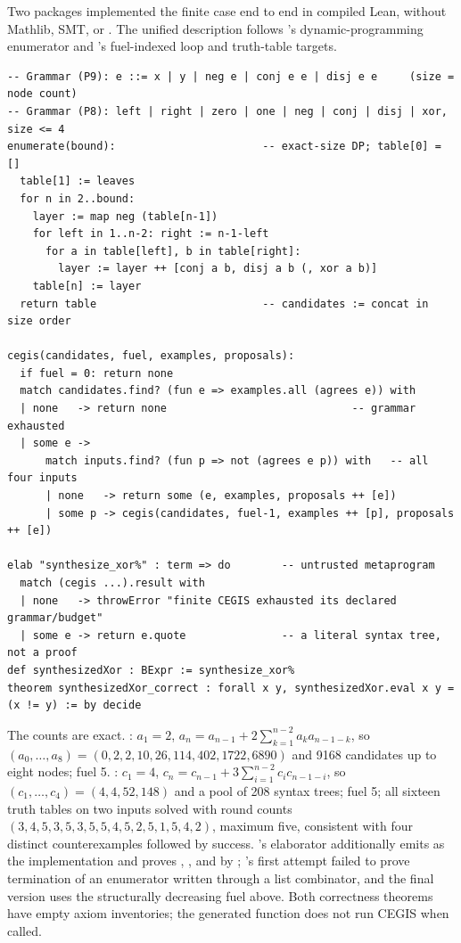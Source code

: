 Two packages implemented the finite case end to end in compiled Lean, without Mathlib, SMT, or . The unified description follows 's dynamic-programming enumerator and 's fuel-indexed loop and truth-table targets.

\begin{lstlisting}
-- Grammar (P9): e ::= x | y | neg e | conj e e | disj e e     (size = node count)
-- Grammar (P8): left | right | zero | one | neg | conj | disj | xor, size <= 4
enumerate(bound):                       -- exact-size DP; table[0] = []
  table[1] := leaves
  for n in 2..bound:
    layer := map neg (table[n-1])
    for left in 1..n-2: right := n-1-left
      for a in table[left], b in table[right]:
        layer := layer ++ [conj a b, disj a b (, xor a b)]
    table[n] := layer
  return table                          -- candidates := concat in size order

cegis(candidates, fuel, examples, proposals):
  if fuel = 0: return none
  match candidates.find? (fun e => examples.all (agrees e)) with
  | none   -> return none                             -- grammar exhausted
  | some e ->
      match inputs.find? (fun p => not (agrees e p)) with   -- all four inputs
      | none   -> return some (e, examples, proposals ++ [e])
      | some p -> cegis(candidates, fuel-1, examples ++ [p], proposals ++ [e])

elab "synthesize_xor%" : term => do        -- untrusted metaprogram
  match (cegis ...).result with
  | none   -> throwError "finite CEGIS exhausted its declared grammar/budget"
  | some e -> return e.quote               -- a literal syntax tree, not a proof
def synthesizedXor : BExpr := synthesize_xor%
theorem synthesizedXor_correct : forall x y, synthesizedXor.eval x y = (x != y) := by decide
\end{lstlisting}
The counts are exact. : $a_1=2$, $a_n=a_{n-1}+2\sum_{k=1}^{n-2}a_k a_{n-1-k}$, so $(a_0,\ldots,a_8)=(0,2,2,10,26,114,402,1722,6890)$ and 9168 candidates up to eight nodes; fuel 5. : $c_1=4$, $c_n=c_{n-1}+3\sum_{i=1}^{n-2}c_ic_{n-1-i}$, so $(c_1,\ldots,c_4)=(4,4,52,148)$ and a pool of 208 syntax trees; fuel 5; all sixteen truth tables on two inputs solved with round counts $(3,4,5,3,5,3,5,5,4,5,2,5,1,5,4,2)$, maximum five, consistent with four distinct counterexamples followed by success. 's  elaborator additionally emits  as the implementation and proves , , and  by ; 's first attempt failed to prove termination of an enumerator written through a list combinator, and the final version uses the structurally decreasing fuel above. Both correctness theorems have empty axiom inventories; the generated function does not run CEGIS when called.


